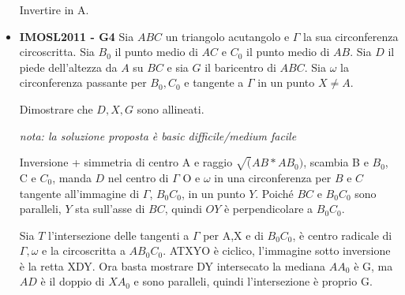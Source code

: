 \begin{itemize}
    \begin{sol}
    Invertire in A.
    \end{sol}

    
    
	\item \textbf{IMOSL2011 - G4} Sia $ABC$ un triangolo acutangolo e $\Gamma$ la sua circonferenza circoscritta. Sia $B_0$ il punto medio di $AC$ e $C_0$ il punto medio di $AB$. Sia $D$ il piede dell'altezza da $A$ su $BC$ e sia $G$ il baricentro di $ABC$. Sia $\omega$ la circonferenza passante per $B_0,C_0$ e tangente a $\Gamma$ in un punto $X\neq A$. 
	
	Dimostrare che $D,X,G$ sono allineati.
	
	\begin{sol}
	\emph{nota: la soluzione proposta è basic difficile/medium facile}
	
	Inversione + simmetria di centro A e raggio $\sqrt(AB*AB_0)$, scambia B e $B_0$, C e $C_0$, manda $D$ nel centro di $\Gamma$ O e $\omega$ in una circonferenza per $B$ e $C$ tangente all'immagine di $\Gamma$, $B_0C_0$, in un punto $Y$. Poiché $BC$ e $B_0C_0$ sono paralleli, $Y$ sta sull'asse di $BC$, quindi $OY$ è perpendicolare a $B_0C_0$. 
	
	Sia $T$ l'intersezione delle tangenti a $\Gamma$ per A,X e di $B_0C_0$, è centro radicale di $\Gamma, \omega$ e la circoscritta a $AB_0C_0$. ATXYO è ciclico, l'immagine sotto inversione è la retta XDY. Ora basta mostrare DY intersecato la mediana $AA_0$ è G, ma $AD$ è il doppio di $XA_0$ e sono paralleli, quindi l'intersezione è proprio G.
	\end{sol}
	


	\end{itemize}
	
	
